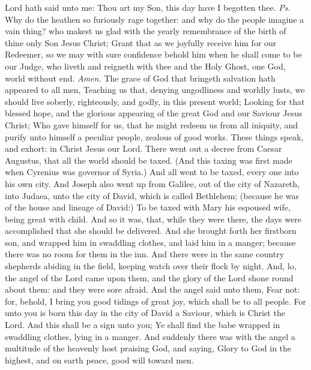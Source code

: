 
\introit
{} Lord hath said unto me: Thou art my Son, this day have I begotten thee. \textit{Ps.} Why do the heathen so furiously rage together: and why do the people imagine a vain thing?
\collect
{} who makest us glad with the yearly remembrance of the birth of thine only Son Jesus Christ; Grant that as we joyfully receive him for our Redeemer, so we may with sure confidence behold him when he shall come to be our Judge, who liveth and reigneth with thee and the Holy Ghost, one God, world without end. \textit{Amen.}
 The grace of God that bringeth salvation hath appeared to all men, Teaching us that, denying ungodliness and worldly lusts, we should live soberly, righteously, and godly, in this present world; Looking for that blessed hope, and the glorious appearing of the great God and our Saviour Jesus Christ; Who gave himself for us, that he might redeem us from all iniquity, and purify unto himself a peculiar people, zealous of good works. These things speak, and exhort: in Christ Jesus our Lord.
 There went out a decree from Caesar Augustus, that all the world should be taxed. (And this taxing was first made when Cyrenius was governor of Syria.) And all went to be taxed, every one into his own city. And Joseph also went up from Galilee, out of the city of Nazareth, into Judaea, unto the city of David, which is called Bethlehem; (because he was of the house and lineage of David:) To be taxed with Mary his espoused wife, being great with child. And so it was, that, while they were there, the days were accomplished that she should be delivered. And she brought forth her firstborn son, and wrapped him in swaddling clothes, and laid him in a manger; because there was no room for them in the inn. And there were in the same country shepherds abiding in the field, keeping watch over their flock by night. And, lo, the angel of the Lord came upon them, and the glory of the Lord shone round about them: and they were sore afraid. And the angel said unto them, Fear not: for, behold, I bring you good tidings of great joy, which shall be to all people. For unto you is born this day in the city of David a Saviour, which is Christ the Lord. And this shall be a sign unto you; Ye shall find the babe wrapped in swaddling clothes, lying in a manger. And suddenly there was with the angel a multitude of the heavenly host praising God, and saying, Glory to God in the highest, and on earth peace, good will toward men.
